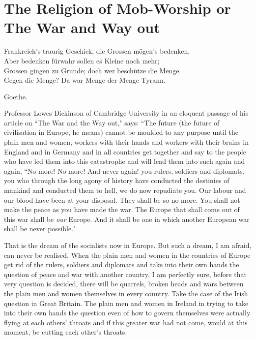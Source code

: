 \chapter{The Religion of Mob-Worship or The War and Way out}

\begin{center}
    Frankreich's traurig Geschick, die Grossen m\"ogen's bedenken,\\
    Aber bedenken f\"urwahr sollen es Kleine noch mehr;\\
    Grossen gingen zu Grunde; doch wer besch\"utze die Menge \\
    Gegen die Menge? Da war Menge der Menge Tyrann. 
\end{center}
\hfill Goethe\cite{num27}.

Professor Lowes Dickinson of Cambridge University in an eloquent passage of his article on ``The War and the Way out," says: ``The future (the future of civilisation in Europe, he means) cannot be moulded to any purpose until the plain men and women, workers with their hands and workers with their brains in England and in Germany and in all countries get together and say to the people who have led them into this catastrophe and will lead them into such again and again, ``No more! No more! And never again! you rulers, soldiers and diplomats, you who through the long agony of history have conducted the destinies of mankind and conducted them to hell, we do now repudiate you.
Our labour and our blood have been at your disposal.
They shall be so no more.
You shall not make the peace as you have made the war.
The Europe that shall come out of this war shall be \emph{our} Europe.
And it shall be one in which another European war shall be never possible."

That is the dream of the socialists now in Europe.
But such a dream, I am afraid, can never be realised.
When the plain men and women in the countries of Europe get rid of the rulers, soldiers and diplomats and take into their own hands the question of peace and war with another country, I am perfectly sure, before that very question is decided, there will be quarrels, broken heads and wars between the plain men and women themselves in every country.
Take the case of the Irish question in Great Britain.
The plain men and women in Ireland in trying to take into their own hands the question even of how to govern themselves were actually flying at each others' throats and if this greater war had not come, would at this moment, be cutting each other's throats.

